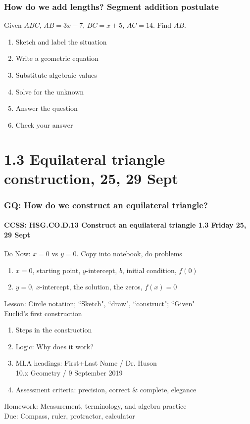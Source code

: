 \documentclass{beamer}
\begin{document}
  \frame
  {
    \frametitle{How do we add lengths? Segment addition postulate}
    
    Given $\overline{ABC}$, $AB=3x-7$, $BC=x+5$, $AC=14$. Find ${AB}$.\\[0.5in]
        \vspace{1cm}
  \begin{enumerate}
      \item<2-> Sketch and label the situation\\
      \item<2-> Write a geometric equation\\
      \item<2-> Substitute algebraic values\\
      \item<2-> Solve for the unknown\\
      \item<2-> Answer the question\\
      \item<2-> Check your answer
    \end{enumerate}
  }

\section{1.3 Equilateral triangle construction, 25, 29 Sept}
\frame
{
  \frametitle{GQ: How do we construct an equilateral triangle?}
  \framesubtitle{CCSS: HSG.CO.D.13 Construct an equilateral triangle \hfill \alert{1.3 Friday 25, 29 Sept}}

  \begin{block}{Do Now: $x=0$ vs $y=0$. Copy into notebook, do problems}
  \begin{enumerate}
      \item $x=0$, starting point, $y$-intercept, $b$, initial condition, $f(0)$
      \item $y=0$, $x$-intercept, the solution, the zeros, $f(x)=0$
  \end{enumerate}
  \end{block}
  Lesson: Circle notation; ``Sketch", ``draw", ``construct"; ``Given"\\[5pt]
  Euclid's first construction
  \begin{enumerate}
      \item Steps in the construction
      \item Logic: Why does it work?
      \item MLA headings: First+Last Name / Dr. Huson \\
      10.x Geometry / 9 September 2019
      \item Assessment criteria: precision, correct \& complete, elegance
  \end{enumerate}
  Homework: Measurement, terminology, and algebra practice\\
  Due: Compass, ruler, protractor, calculator
}
\end{document}
